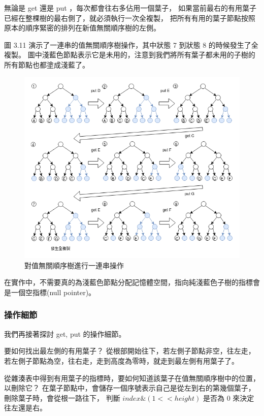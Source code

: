 無論是 get 還是 put ，每次都會往右多佔用一個葉子，
如果當前最右的有用葉子已經在整棵樹的最右側了，就必須執行一次全複製，
把所有有用的葉子節點按照原本的順序緊密的排列在新值無關順序樹的左側。

圖 3.11 演示了一連串的值無關順序樹操作，其中狀態 7 到狀態 8 的時候發生了全複製。
圖中淺藍色節點表示它是未用的，注意到我們將所有葉子都未用的子樹的所有節點也都塗成淺藍了。

\begin{figure}[h!]
\includegraphics[width=\textwidth]{順序樹連續變化}
\caption{對值無關順序樹進行一連串操作}
\end{figure}

在實作中，不需要真的為淺藍色節點分配記憶體空間，指向純淺藍色子樹的指標會是一個空指標(null pointer)。

\subsubsection{操作細節}

我們再接著探討 get, put 的操作細節。

要如何找出最左側的有用葉子？
從根部開始往下，若左側子節點非空，往左走，若左側子節點為空，往右走，走到高度為零時，就走到最左側有用葉子了。

從雜湊表中得到有用葉子的指標時，要如何知道該葉子在值無關順序樹中的位置，以刪除它？
在葉子節點中，會儲存一個序號表示自己是從左到右的第幾個葉子，刪除葉子時，會從根一路往下，
判斷 $index \& (1 << height)$ 是否為 0 來決定往左還是右。

